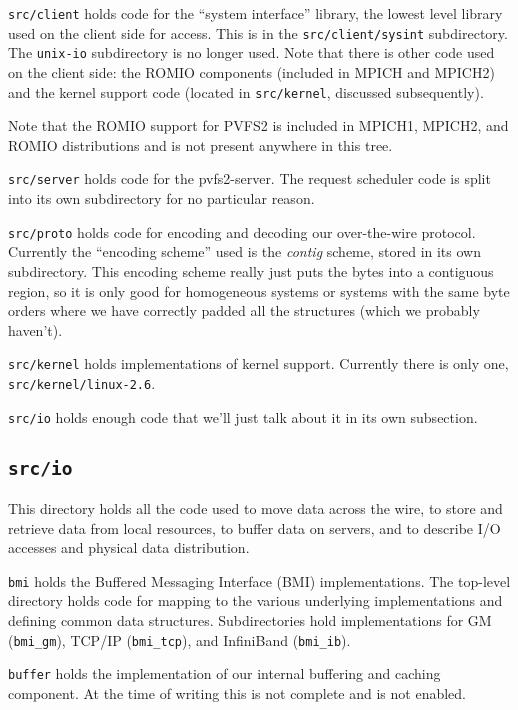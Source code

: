 \texttt{src/client} holds code for the ``system interface'' library, the
lowest level library used on the client side for access.  This is in the
\texttt{src/client/sysint} subdirectory.  The \texttt{unix-io} subdirectory is
no longer used.  Note that there is other code used on the client side: the
ROMIO components (included in MPICH and MPICH2) and the kernel support code
(located in \texttt{src/kernel}, discussed subsequently).

Note that the ROMIO support for PVFS2 is included in MPICH1, MPICH2, and ROMIO
distributions and is not present anywhere in this tree.

\texttt{src/server} holds code for the pvfs2-server.  The request scheduler
code is split into its own subdirectory for no particular reason.

\texttt{src/proto} holds code for encoding and decoding our over-the-wire
protocol.  Currently the ``encoding scheme'' used is the \emph{contig}
scheme, stored in its own subdirectory.  This encoding scheme really just puts
the bytes into a contiguous region, so it is only good for homogeneous systems
or systems with the same byte orders where we have correctly padded all the
structures (which we probably haven't).

\texttt{src/kernel} holds implementations of kernel support.  Currently there
is only one, \texttt{src/kernel/linux-2.6}.

\texttt{src/io} holds enough code that we'll just talk about it in its own
subsection.

\subsection{\texttt{src/io}}

This directory holds all the code used to move data across the wire, to store
and retrieve data from local resources, to buffer data on servers, and to
describe I/O accesses and physical data distribution.

\texttt{bmi} holds the Buffered Messaging Interface (BMI) implementations.
The top-level directory holds code for mapping to the various underlying
implementations and defining common data structures.  Subdirectories hold
implementations for GM (\texttt{bmi\_gm}), TCP/IP (\texttt{bmi\_tcp}), and
InfiniBand (\texttt{bmi\_ib}).

\texttt{buffer} holds the implementation of our internal buffering and caching
component.  At the time of writing this is not complete and is not enabled.


